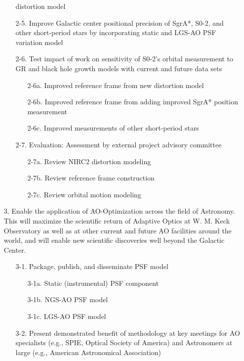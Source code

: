 \begin{itemize}
\begin{itemize}
    distortion model
  \item[2-5.] Improve Galactic center positional precision of SgrA*,
    S0-2, and other short-period stars by incorporating static and
    LGS-AO PSF variation model
  \item[2-6.] Test impact of work on sensitivity of S0-2’s orbital
    measurement to GR and black hole growth models with current and
    future data sets
    \begin{itemize}
    \item[2-6a.] Improved reference frame from new distortion model
    \item[2-6b.] Improved reference frame from adding improved SgrA*
      position measurement
    \item[2-6c.] Improved measurements of other short-period stars
    \end{itemize}
  \item[2-7.] Evaluation: Assessment by external project advisory
    committee 
    \begin{itemize}
    \item[2-7a.] Review NIRC2 distortion modeling
    \item[2-7b.] Review reference frame construction
    \item[2-7c.] Review orbital motion modeling
    \end{itemize}
  \end{itemize}
\item[3.] Enable the application of AO-Optimization across the field of
  Astronomy. This will maximize the scientific return of Adaptive
  Optics at W. M. Keck Observatory as well as at other current and
  future AO facilities around the world, and will enable new
  scientific discoveries well beyond the Galactic Center.
  \begin{itemize}
  \item[3-1.] Package, publish, and disseminate PSF model
    \begin{itemize}
    \item[3-1a.] Static (instrumental) PSF component
    \item[3-1b.] NGS-AO PSF model
    \item[3-1c.] LGS-AO PSF model
    \end{itemize}
  \item[3-2.] Present demonstrated benefit of methodology at key
    meetings for AO specialists (e.g., SPIE, Optical Society of
    America) and Astronomers at large (e.g., American Astronomical
    Association)
    \begin{itemize}

\end{itemize}
\end{itemize}
\end{itemize}
